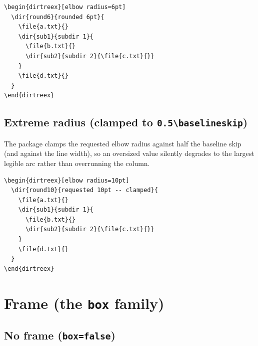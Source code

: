 \documentclass[11pt]{article}
\begin{document}
\begin{Verbatim}
\begin{dirtreex}[elbow radius=6pt]
  \dir{round6}{rounded 6pt}{
    \file{a.txt}{}
    \dir{sub1}{subdir 1}{
      \file{b.txt}{}
      \dir{sub2}{subdir 2}{\file{c.txt}{}}
    }
    \file{d.txt}{}
  }
\end{dirtreex}
\end{Verbatim}

\begin{dirtreex}[elbow radius=6pt]
\end{dirtreex}

\subsection{Extreme radius (clamped to \texttt{0.5\textbackslash baselineskip})}

The package clamps the requested elbow radius against half the baseline skip (and against the line width), so an oversized value silently degrades to the largest legible arc rather than overrunning the column.

\begin{Verbatim}
\begin{dirtreex}[elbow radius=10pt]
  \dir{round10}{requested 10pt -- clamped}{
    \file{a.txt}{}
    \dir{sub1}{subdir 1}{
      \file{b.txt}{}
      \dir{sub2}{subdir 2}{\file{c.txt}{}}
    }
    \file{d.txt}{}
  }
\end{dirtreex}
\end{Verbatim}

\begin{dirtreex}[elbow radius=10pt]
\end{dirtreex}

\clearpage

\section{Frame (the \texttt{box} family)}

\subsection{No frame (\texttt{box=false})}
\end{document}
